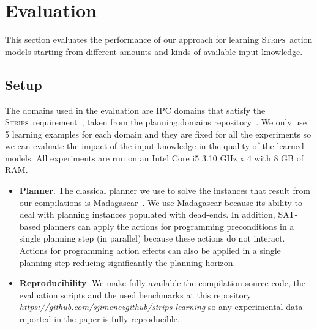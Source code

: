 \documentclass[3p,times]{elsarticle}
\newcommand{\strips}{\textsc{Strips}}     %
\begin{document}
\section{Evaluation}
\label{sec:Section8}
This section evaluates the performance of our approach for learning \strips\ action models starting from different amounts and kinds of available input knowledge.

\subsection{Setup}
The domains used in the evaluation are IPC domains that satisfy the \strips\ requirement~\cite{fox2003pddl2}, taken from the {\sc planning.domains} repository~\cite{muise2016planning}. We only use 5 learning examples for each domain and they are fixed for all the experiments so we can evaluate the impact of the input knowledge in the quality of the learned models. All experiments are run on an Intel Core i5 3.10 GHz x 4 with 8 GB of RAM.
\begin{itemize}
\item {\bf Planner}. The classical planner we use to solve the instances that result from our compilations is {\sc Madagascar}~\cite{rintanen2014madagascar}. We use {\sc Madagascar} because its ability to deal with planning instances populated with dead-ends. In addition, SAT-based planners can apply the actions for programming preconditions in a single planning step (in parallel) because these actions do not interact. Actions for programming action effects can also be applied in a single planning step reducing significantly the planning horizon.
\item {\bf Reproducibility}. We make fully available the compilation source code, the evaluation scripts and the used benchmarks at this repository {\em https://github.com/sjimenezgithub/strips-learning} so any experimental data reported in the paper is fully reproducible. 
\end{itemize}
\end{document}
